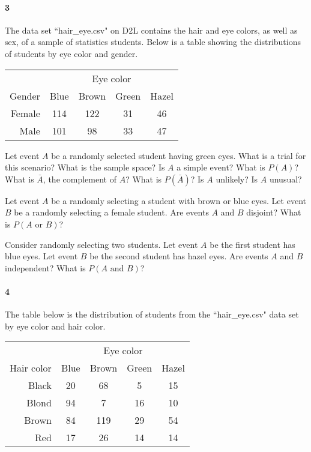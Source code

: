 \documentclass{article}
\begin{document}
\begin{flushleft}
\begin{enumalpha}
\end{enumalpha}

\newpage
\paragraph{3} The data set ``hair\_eye.csv" on D2L contains the hair and eye colors, as well as sex, of a sample of statistics students. Below is a table showing the distributions of students by eye color and gender.\\
\medskip
\renewcommand{\arraystretch}{1}
{\centering
\begin{tabular}{ r| c c c c}
& \multicolumn{4}{c}{Eye color}\\
Gender & Blue & Brown & Green & Hazel\\
\hline
 Female &  114   &  122  &  31  &  46\\
 Male   & 101  &  98  &  33  &  47\\
\end{tabular}
\par}
\begin{enumalpha}
\item Let event $A$ be a randomly selected student having green eyes. What is a trial for this scenario? What is the sample space? Is $A$ a simple event? What is $P(A)$? What is $\bar A$, the complement of $A$? What is $P(\bar A)$? Is $A$ unlikely? Is $A$ unusual?
\vspace{2.25in}
\item Let event $A$ be a randomly selecting a student with brown or blue eyes. Let event $B$ be a randomly selecting a female student. Are events $A$ and $B$ disjoint? What is $P(A \text{ or } B)$?
\vspace{2.25in}
\item Consider randomly selecting two students. Let event $A$ be the first student has blue eyes. Let event $B$ be the second student has hazel eyes. Are events $A$ and $B$ independent? What is $P(A \text { and } B)$?

\end{enumalpha}

\newpage
\paragraph{4} The table below is the distribution of students from the ``hair\_eye.csv" data set by eye color and hair color.\\
\medskip
\renewcommand{\arraystretch}{1}
{\centering
\begin{tabular}{ r| c c c c}
& \multicolumn{4}{c}{Eye color}\\
Hair color & Blue & Brown & Green & Hazel\\
\hline
  Black &  20  &  68  &   5  &  15\\
 Blond  & 94   &  7  &  16  &  10\\
 Brown &  84  & 119  &  29  &  54\\
 Red   &  17  &  26  &  14  &  14
\end{tabular}
\par}


\end{flushleft}
\end{document}
